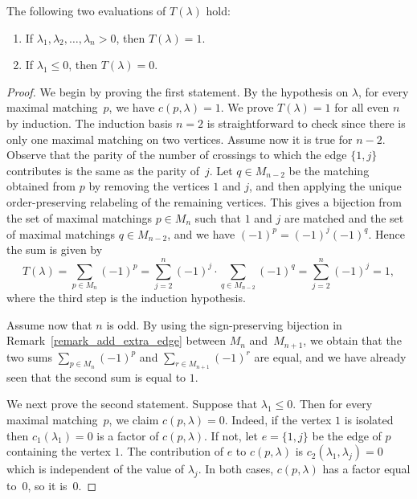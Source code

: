 \documentclass[ALCO,ThmDefs,Unicode,epreuves]{cedram}
\begin{document}
\begin{lemma}
The following two evaluations of $T(\lambda)$ hold:
\begin{enumerate}
\item\label{lemma7.3_1} If $\lambda_{1},\lambda_{2},\ldots,\lambda_{n}>0$, then $T(\lambda)=1$.
\item\label{lemma7.3_2} If $\lambda_{1}\leq 0$, then $T(\lambda)=0$.
\end{enumerate}
\label{lemma_T_two_statements}
\end{lemma}
\begin{proof}
We begin by proving the first statement.
By the hypothesis on $\lambda$, for every maximal matching~$p$,
we have $c(p,\lambda)=1$.
We prove 
$T(\lambda) = 1$ for all even $n$ by induction.
The induction basis $n=2$ is straightforward to check
since there is only one maximal matching on two vertices.
Assume now it is true for $n-2$.
Observe that the parity of the number 
of crossings to which the edge $\{1,j\}$ contributes is
the same as the parity of~$j$. 
Let $q \in M_{n-2}$ be the matching obtained from $p$ by removing
the vertices $1$ and $j$, and then applying 
the unique order-preserving relabeling of the remaining vertices.
This gives a bijection from the set of maximal matchings $p\in M_{n}$ such that
$1$ and $j$ are matched and the set of maximal matchings $q\in M_{n-2}$, and we
have $(-1)^p=(-1)^j (-1)^q$.
Hence the sum is given by
$$
T(\lambda)
=
\sum_{p \in M_{n}} (-1)^{p}
=
\sum_{j=2}^{n}  (-1)^{j} \cdot \sum_{q \in M_{n-2}} (-1)^{q}
=
\sum_{j=2}^{n}  (-1)^{j} 
=
1 ,
$$
where the third step is the induction hypothesis.

Assume now that $n$ is odd.
By using the sign-preserving bijection in
Remark~\ref{remark_add_extra_edge}
between $M_{n}$ and~$M_{n+1}$,
we obtain that
the two sums
$\sum_{p \in M_{n}} (-1)^{p}$
and
$\sum_{r \in M_{n+1}} (-1)^{r}$
are equal, and we have already seen that the second sum is equal to $1$.



We next prove the second statement.
Suppose that $\lambda_{1} \leq 0$. 
Then for every maximal matching~$p$, we claim $c(p,\lambda)=0$. 
Indeed, if the vertex $1$ is isolated then
$c_{1}(\lambda_{1}) = 0$ is a factor of $c(p, \lambda)$.
If not, let $e = \{1,j\}$ be the edge of $p$ containing the vertex $1$.
The contribution of $e$ to $c(p,\lambda)$ is $c_{2}(\lambda_{1},\lambda_{j})=0$
which is independent of the value of $\lambda_{j}$.
In both cases, $c(p,\lambda)$ has a factor equal to~$0$, so it is~$0$. 
\end{proof}
\end{document}

